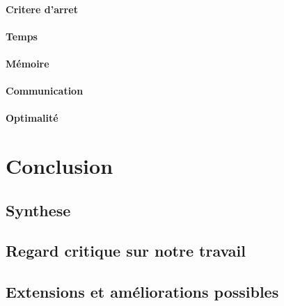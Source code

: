 \documentclass[a4paper, 10pt]{article}
\begin{document}
\paragraph{Critere d'arret}

\paragraph{Temps}

\paragraph{Mémoire}

\paragraph{Communication}

\paragraph{Optimalité}

\newpage
\section{Conclusion}

\subsection{Synthese}

\subsection{Regard critique sur notre travail}

\subsection{Extensions et améliorations possibles}
\end{document}
